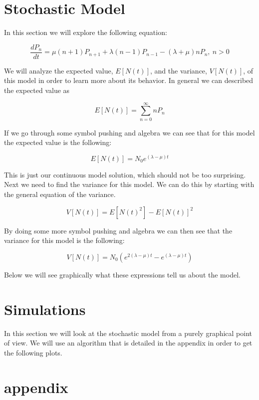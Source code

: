 \documentclass[11pt, oneside]{article}   	%
\begin{document}

\section{Stochastic Model}

In this section we will explore the following equation:

$$\frac{dP_n}{dt} = \mu (n+1)P_{n+1}+\lambda (n-1)P_{n-1}-(\lambda+\mu)nP_n, \ n>0$$

We will analyze the expected value, $E[N(t)]$, and the variance, $V[N(t)]$, of this model in order to learn more about its behavior.
In general we can described the expected value as

$$E[N(t)] = \sum_{n=0}^\infty n P_n$$

If we go through some symbol pushing and algebra we can see that for this model the expected value is the following:

 $$E[N(t)] = N_0 e^{(\lambda-\mu)t}$$

 This is just our continuous model solution, which should not be too surprising.
 Next we need to find the variance for this model.
 We can do this by starting with the general equation of the variance.

 $$V[N(t)] = E[N(t)^2]-E[N(t)]^2$$

 By doing some more symbol pushing and algebra we can then see that the variance for this model is the following:

 $$V[N(t)] = N_0\left(e^{2(\lambda-\mu)t} - e^{(\lambda-\mu)t}\right)$$

 Below we will see graphically what these expressions tell us about the model.


 \section{Simulations}

 In this section we will look at the stochastic model from a purely graphical point of view.
 We will use an algorithm that is detailed in the appendix in order to get the following plots.


 \section{appendix}
\end{document}
